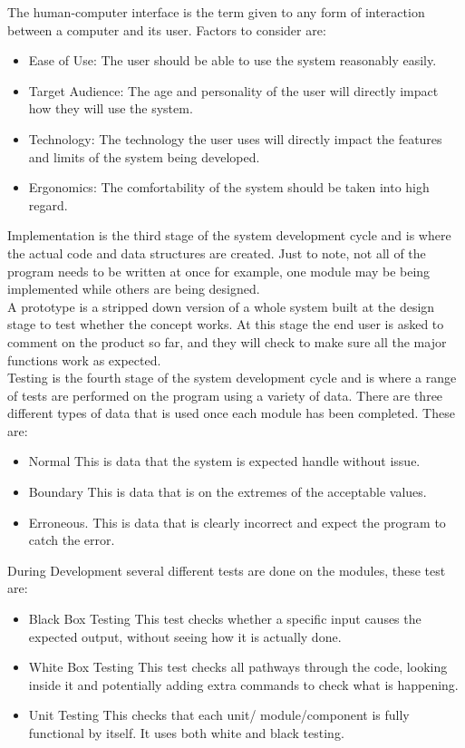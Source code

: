   The human-computer interface is the term given to any form of interaction between a computer and its user. Factors to consider are:
  \begin{itemize}
    \setlength\itemsep{0em}
    \item Ease of Use: The user should be able to use the system reasonably easily.
    \item Target Audience: The age and personality of the user will directly impact how they will use the system.
    \item Technology: The technology the user uses will directly impact the features and limits of the system being developed.
    \item Ergonomics: The comfortability of the system should be taken into high regard.
  \end{itemize}
  Implementation is the third stage of the system development cycle and is where the actual code and data structures are created. Just to note, not all of the program needs to be written at once for example, one module may be being implemented while others are being designed.\\
  A prototype is a stripped down version of a whole system built at the design stage to test whether the concept works. At this stage the end user is asked to comment on the product so far, and they will check to make sure all the major functions work as expected.\\
  Testing is the fourth stage of the system development cycle and is where a range of tests are performed on the program using a variety of data. There are three different types of data that is used once each module has been completed. These are:
  \begin{itemize}
    \setlength\itemsep{0em}
    \item Normal
      \subitem This is data that the system is expected handle without issue.
    \item Boundary
      \subitem This is data that is on the extremes of the acceptable values.
    \item Erroneous.
      \subitem This is data that is clearly incorrect and expect the program to catch the error.
  \end{itemize}
  During Development several different tests are done on the modules, these test are:
  \begin{itemize}
    \setlength\itemsep{0em}
    \item Black Box Testing
      \subitem This test checks whether a specific input causes the expected output, without seeing how it is actually done.
    \item White Box Testing
      \subitem This test checks all pathways through the code, looking inside it and potentially adding extra commands to check what is happening.
    \item Unit Testing
    \subitem This checks that each unit/ module/component is fully functional by itself. It uses both white and black testing.
  \end{itemize}
